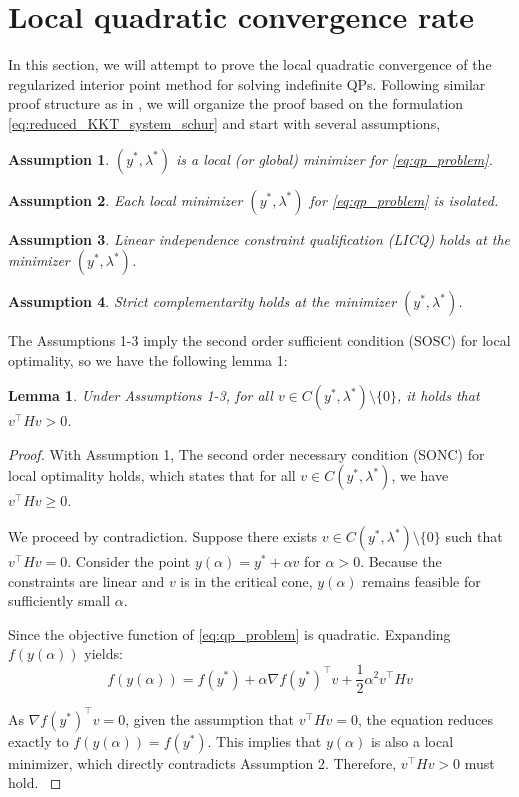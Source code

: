 \documentclass[conference]{IEEEtran}
\theoremstyle{plain}
\newtheorem{assumption}{Assumption}
\newtheorem{lemma}[theorem]{Lemma}
\begin{document}
\section{Local quadratic convergence rate}
In this section, 
we will attempt to prove the local quadratic convergence of the regularized interior point method for solving indefinite QPs.
Following similar proof structure as in \cite{absilNewtonKKTInteriorpointMethods2007},
we will organize the proof based on the formulation \ref{eq:reduced_KKT_system_schur} and start with several assumptions,

\begin{assumption}
    $(y^*, \lambda^*)$ is a local (or global) minimizer for \ref{eq:qp_problem}.
\end{assumption}

\begin{assumption}
    Each local minimizer $(y^*,\lambda^*)$ for \ref{eq:qp_problem} is isolated.
\end{assumption}

\begin{assumption}
    Linear independence constraint qualification (LICQ) holds at the minimizer $(y^*, \lambda^*)$.
\end{assumption}

\begin{assumption}
    Strict complementarity holds at the minimizer $(y^*, \lambda^*)$.
\end{assumption}

The Assumptions 1-3 imply the second order sufficient condition (SOSC) for local optimality,
so we have the following lemma 1:
\begin{lemma}
    Under Assumptions 1-3, for all $v \in C(y^*,\lambda^*) \setminus \{0\}$, it holds that $v^\top H v > 0$.
\end{lemma}

\begin{proof}
    With Assumption 1, The second order necessary condition (SONC) for local optimality holds, which states that for all $v \in C(y^*,\lambda^*)$, we have $v^\top H v \ge 0$.

    We proceed by contradiction. Suppose there exists $v \in C(y^*,\lambda^*) \setminus \{0\}$ such that $v^\top H v = 0$. 
    Consider the point $y(\alpha) = y^* + \alpha v$ for $\alpha > 0$. Because the constraints are linear and $v$ is in the critical cone, $y(\alpha)$ remains feasible for sufficiently small $\alpha$. 

    Since the objective function of \ref{eq:qp_problem} is quadratic. Expanding $f(y(\alpha))$ yields:
    $$f(y(\alpha)) = f(y^*) + \alpha \nabla f(y^*)^\top v + \frac{1}{2} \alpha^2 v^\top H v$$

    As $\nabla f(y^*)^\top v = 0$, given the assumption that $v^\top H v = 0$, the equation reduces exactly to $f(y(\alpha)) = f(y^*)$. 
    This implies that $y(\alpha)$ is also a local minimizer, which directly contradicts Assumption 2. Therefore, $v^\top H v > 0$ must hold.
    \label{proof:SOSC}
\end{proof}
\end{document}
